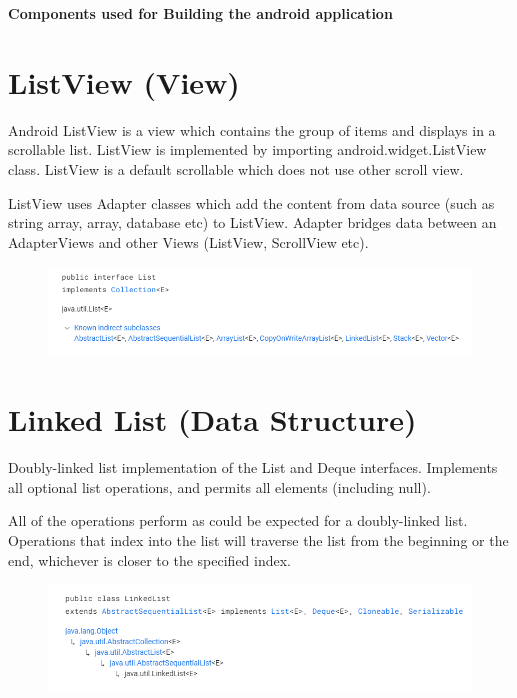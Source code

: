 \documentclass[11pt,a4paper]{report}
\begin{document}
\textbf{{\large{Components used for Building the android application}}}
\section{ListView (View)}
\vskip 0.5cm
Android ListView is a view which contains the group of items and displays in a scrollable list. ListView is implemented by importing android.widget.ListView class. 
ListView is a default scrollable which does not use other scroll view.

ListView uses Adapter classes which add the content from data source (such as string array, array, database etc) to ListView. Adapter
 bridges data between an AdapterViews and other Views (ListView, ScrollView etc).

\begin{figure}[H]
	\centering
	\includegraphics[scale=0.75]{./img/Screenshot (146).png}
\end{figure}


\section{Linked List (Data Structure)}
Doubly-linked list implementation of the List and Deque interfaces. Implements all optional list operations, and permits all elements (including null).

All of the operations perform as could be expected for a doubly-linked list. Operations that index into the list will traverse the list from the beginning or the end, whichever is closer to the specified index.
	\begin{figure}[H]
		\centering
		\includegraphics[scale=0.75]{./img/Screenshot (145).png}
	\end{figure}
\end{document}
